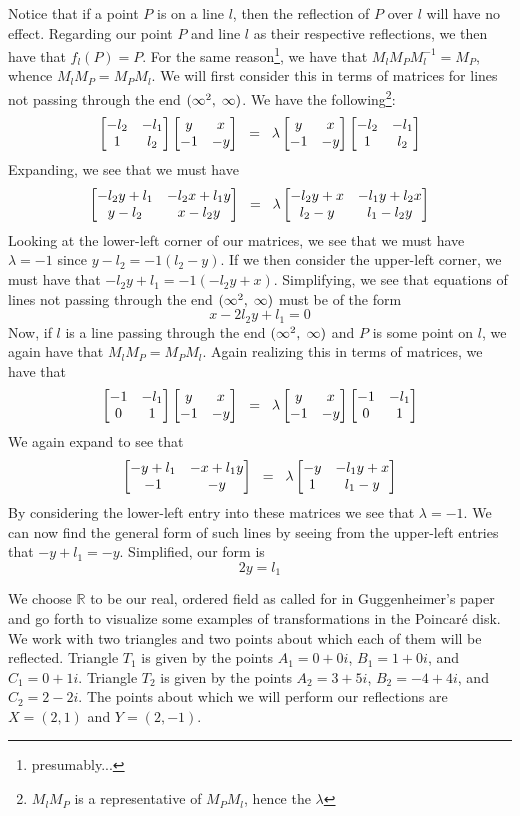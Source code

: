 \documentclass[12pt]{article}
\newcommand{\R}{\mathbb{R}}
\newcommand{\poincare}{Poincar\'{e} }
\newcommand{\inv}{^{-1}}
\newcommand{\spceq}{\hspace{2mm} = \hspace{2mm}}
\newcommand{\ttc}{, \hspace{1mm}}
\newcommand{\lftmat}[4]{\begin{bmatrix} {#1} & {#2} \\ {#3} & {#4} \end{bmatrix}}
\newcommand{\pointmat}[2]{\lftmat{{#2}}{{#1}}{-1}{-{#2}}}
\newcommand{\stanpointmat}{\pointmat{x}{y}}
\newcommand{\linenoendmat}[2]{\begin{bmatrix} -{#2} & -{#1} \\ 1 & {#2} \end{bmatrix}}
\newcommand{\stanlinenoendmat}{\linenoendmat{l_1}{l_2}}
\newcommand{\lineendmat}[2]{\begin{bmatrix} -1 & -{#1} \\ 0 & 1 \end{bmatrix}}
\newcommand{\stanlineendmat}{\lineendmat{l_1}{l_2}}
\newcommand{\specialend}{(\infty^2\ttc\infty)}
\theoremstyle{plain}
\theoremstyle{definition}
\begin{document}
Notice that if a point $P$ is on a line $l$, then the reflection of $P$ over $l$ will have no effect. Regarding our point $P$ and line $l$ as their respective reflections, we then have that $f_l(P) = P$. For the same reason\footnote{presumably...}, we have that $M_l M_P M_l\inv = M_P$, whence $M_l M_P = M_P M_l$. We will first consider this in terms of matrices for lines not passing through the end $\specialend$. We have the following\footnote{$M_l M_P$ is a representative of $M_P M_l$, hence the $\lambda$}:
\begin{equation} 
\stanlinenoendmat\stanpointmat \spceq \lambda \stanpointmat\stanlinenoendmat
\end{equation}	
Expanding, we see that we must have
	\[
		\lftmat{-l_2y+l_1}{-l_2x+l_1y}{y-l_2}{x-l_2y} \spceq \lambda \lftmat{-l_2y+x}{-l_1y+l_2x}{l_2-y}{l_1-l_2y}
	\]
Looking at the lower-left corner of our matrices, we see that we must have $\lambda = -1$ since $y - l_2 = -1(l_2 - y)$. If we then consider the upper-left corner, we must have that $-l_2y + l_1 = -1(-l_2y + x)$. Simplifying, we see that equations of lines not passing through the end $\specialend$ must be of the form
\begin{equation}
	x - 2l_2y + l_1  = 0
\end{equation} 
Now, if $l$ is a line passing through the end $\specialend$ and $P$ is some point on $l$, we again have that $M_l M_P = M_P M_l$. Again realizing this in terms of matrices, we have that 
\begin{equation} 
	\stanlineendmat\stanpointmat \spceq \lambda \stanpointmat\stanlineendmat
\end{equation}	
We again expand to see that 
	\[
		\lftmat{-y+l_1}{-x+l_1y}{-1}{-y} \spceq \lambda \lftmat{-y}{-l_1y+x}{1}{l_1-y}
	\]
By considering the lower-left entry into these matrices we see that $\lambda = -1$. We can now find the general form of such lines by seeing from the upper-left entries that $-y+l_1 = -y$. Simplified, our form is 
\begin{equation}
	2y = l_1
\end{equation} 








\newpage\wtflatex{Examples in $\R$}

We choose $\R$ to be our real, ordered field as called for in Guggenheimer's paper and go forth to visualize some examples of transformations in the \poincare disk. We work with two triangles and two points about which each of them will be reflected. Triangle $T_1$ is given by the points $A_1 = 0 + 0i$, $B_1 = 1 + 0i$, and $C_1 = 0 + 1i$. Triangle $T_2$ is given by the points $A_2 = 3 + 5i$, $B_2 = -4 + 4i$, and $C_2 = 2 - 2i$. The points about which we will perform our reflections are $X = (2, 1)$ and $Y = (2, -1)$.
\end{document}
